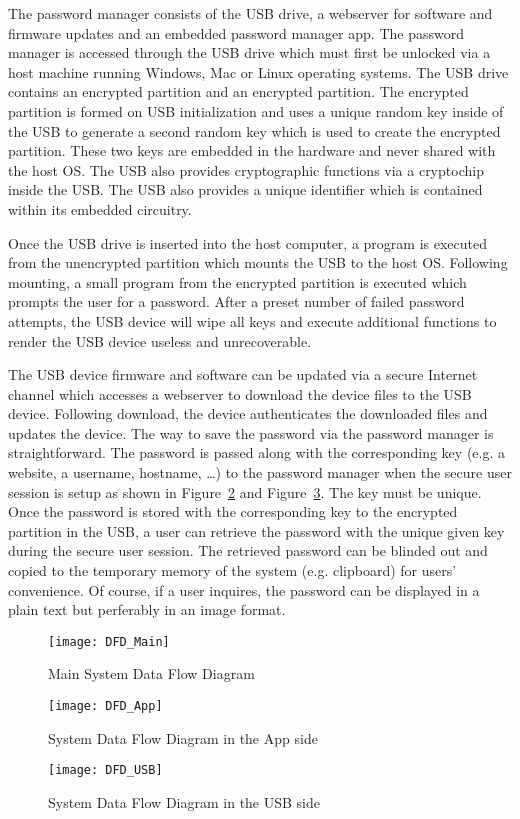 The password manager consists of the USB drive, a webserver for software and
firmware updates and an embedded password manager app.  The password manager is
accessed through the USB drive which must first be unlocked via a host machine
running Windows, Mac or Linux operating systems. The USB drive contains an
encrypted partition and an encrypted partition.  The encrypted partition is
formed on USB initialization and uses a unique random key inside of the USB to
generate a second random key which is used to create the encrypted
partition. These two keys are embedded in the hardware and never shared with the
host OS.  The USB also
provides cryptographic functions via a cryptochip inside the USB.  The USB also
provides a unique identifier which is contained within its embedded circuitry.
\par Once the USB drive is inserted into the host computer, a program is
executed from the unencrypted partition which mounts the USB to the host OS.
Following mounting, a small program from the encrypted partition is executed
which prompts the user for a password. After a preset number of failed password
attempts, the USB device will wipe all keys and execute additional functions to
render the USB device useless and unrecoverable.
\par The USB device firmware and software can be updated via a secure Internet
channel which accesses a webserver to download the device files to the USB
device.  Following download, the device authenticates the downloaded files and
updates the device.
The way to save the password via the password manager is straightforward. The
password is passed along with the corresponding key (e.g. a website, a username,
hostname, \dots) to the password manager when the secure user session is
setup as shown in Figure~\ref{fig:dfd_app} and Figure~\ref{fig:dfd_usb}. The key
must be unique. Once
the password is stored with the corresponding key to the encrypted partition in
the USB, a user can retrieve the password with the unique given key during the
secure user session. The retrieved password can be blinded out and copied to the
temporary memory of the system (e.g. clipboard) for users' convenience. Of
course, if a user inquires, the password can be displayed in a plain text but
perferably in an image format.

\begin{figure}
    \centering
    \texttt{[image: DFD\_Main]}
    \caption{Main System Data Flow Diagram}
    \label{fig:dfd_main}
\end{figure}
\begin{figure}
    \centering
    \texttt{[image: DFD\_App]}
    \caption{System Data Flow Diagram in the App side}
    \label{fig:dfd_app}
\end{figure}
\begin{figure}
    \centering
    \texttt{[image: DFD\_USB]}
    \caption{System Data Flow Diagram in the USB side}
    \label{fig:dfd_usb}
\end{figure}

